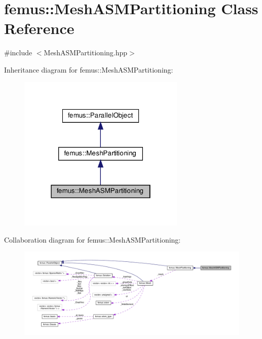 \hypertarget{classfemus_1_1_mesh_a_s_m_partitioning}{}\section{femus\+:\+:Mesh\+A\+S\+M\+Partitioning Class Reference}
\label{classfemus_1_1_mesh_a_s_m_partitioning}


{\ttfamily \#include $<$Mesh\+A\+S\+M\+Partitioning.\+hpp$>$}



Inheritance diagram for femus\+:\+:Mesh\+A\+S\+M\+Partitioning\+:
\nopagebreak
\begin{figure}[H]
\begin{center}
\leavevmode
\includegraphics[width=226pt]{classfemus_1_1_mesh_a_s_m_partitioning__inherit__graph}
\end{center}
\end{figure}


Collaboration diagram for femus\+:\+:Mesh\+A\+S\+M\+Partitioning\+:
\nopagebreak
\begin{figure}[H]
\begin{center}
\leavevmode
\includegraphics[width=350pt]{classfemus_1_1_mesh_a_s_m_partitioning__coll__graph}
\end{center}
\end{figure}
